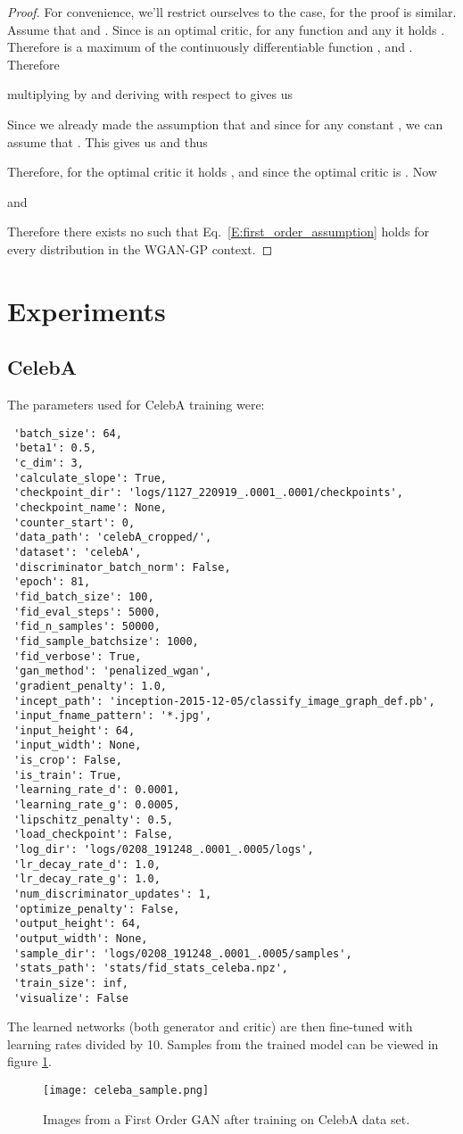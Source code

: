 \documentclass{article}
\begin{document}
 \begin{proof}
  For convenience, we'll restrict ourselves to the  case, for  the proof is similar. Assume that  and . Since  is an optimal critic, for any function  and any 
  it holds . Therefore  is a maximum of the continuously differentiable function
  , and . Therefore
  
  multiplying by  and deriving with respect to  gives us
  
  Since we already made the assumption that  and since  for any constant , we can assume that .
  This gives us  and thus
  
  Therefore, for the optimal critic it holds , and since  the optimal critic is . Now
  
  and
  
  Therefore there exists no  such that Eq.\ \ref{E:first_order_assumption} holds for every distribution in the WGAN-GP context.
 \end{proof}

 \section{Experiments}

 \subsection{CelebA}\label{SS:appendix_celeba_words}
 The parameters used for CelebA training were:
 \begin{verbatim}
 'batch_size': 64,
 'beta1': 0.5,
 'c_dim': 3,
 'calculate_slope': True,
 'checkpoint_dir': 'logs/1127_220919_.0001_.0001/checkpoints',
 'checkpoint_name': None,
 'counter_start': 0,
 'data_path': 'celebA_cropped/',
 'dataset': 'celebA',
 'discriminator_batch_norm': False,
 'epoch': 81,
 'fid_batch_size': 100,
 'fid_eval_steps': 5000,
 'fid_n_samples': 50000,
 'fid_sample_batchsize': 1000,
 'fid_verbose': True,
 'gan_method': 'penalized_wgan',
 'gradient_penalty': 1.0,
 'incept_path': 'inception-2015-12-05/classify_image_graph_def.pb',
 'input_fname_pattern': '*.jpg',
 'input_height': 64,
 'input_width': None,
 'is_crop': False,
 'is_train': True,
 'learning_rate_d': 0.0001,
 'learning_rate_g': 0.0005,
 'lipschitz_penalty': 0.5,
 'load_checkpoint': False,
 'log_dir': 'logs/0208_191248_.0001_.0005/logs',
 'lr_decay_rate_d': 1.0,
 'lr_decay_rate_g': 1.0,
 'num_discriminator_updates': 1,
 'optimize_penalty': False,
 'output_height': 64,
 'output_width': None,
 'sample_dir': 'logs/0208_191248_.0001_.0005/samples',
 'stats_path': 'stats/fid_stats_celeba.npz',
 'train_size': inf,
 'visualize': False
 \end{verbatim}
 The learned networks (both generator and critic) are then fine-tuned with learning rates divided by 10.
 Samples from the trained model can be viewed in figure \ref{F:fogan_faces}.
 \begin{figure}
  \centering
  \texttt{[image: celeba\_sample.png]}
  \caption{Images from a First Order GAN after training on CelebA data set.}\label{F:fogan_faces}
 \end{figure}
\clearpage
\end{document}
